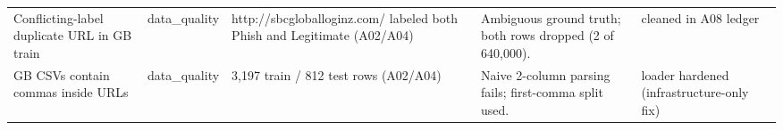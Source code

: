 \begin{table}[htbp]
\begin{tabular}{lllll}
Conflicting-label duplicate URL in GB train & data\_quality & http://sbcgloballoginz.com/ labeled both Phish and Legitimate (A02/A04) & Ambiguous ground truth; both rows dropped (2 of 640,000). & cleaned in A08 ledger \\
GB CSVs contain commas inside URLs & data\_quality & 3,197 train / 812 test rows (A02/A04) & Naive 2-column parsing fails; first-comma split used. & loader hardened (infrastructure-only fix) \\
\bottomrule
\end{tabular}
\end{table}
